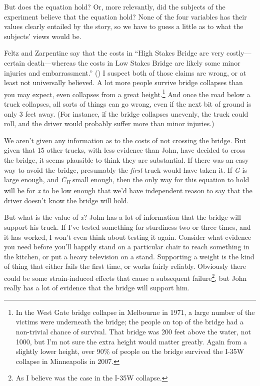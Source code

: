 \documentclass[
  10pt,
  letterpaper,
  DIV=11,
  numbers=noendperiod,
  twoside]{scrartcl}
\begin{document}
But does the equation hold? Or, more relevantly, did the subjects of the
experiment believe that the equation hold? None of the four variables
has their values clearly entailed by the story, so we have to guess a
little as to what the subjects' views would be.

Feltz and Zarpentine say that the costs in ``High Stakes Bridge are very
costly---certain death---whereas the costs in Low Stakes Bridge are
likely some minor injuries and embarrassment.''
() I
suspect both of those claims are wrong, or at least not universally
believed. A lot more people survive bridge collapses than you may
expect, even collapses from a great height.\footnote{In the West Gate
  bridge collapse in Melbourne in 1971, a large number of the victims
  were underneath the bridge; the people on top of the bridge had a
  non-trivial chance of survival. That bridge was 200 feet above the
  water, not 1000, but I'm not sure the extra height would matter
  greatly. Again from a slightly lower height, over 90\% of people on
  the bridge survived the I-35W collapse in Minneapolis in 2007.} And
once the road below a truck collapses, all sorts of things can go wrong,
even if the next bit of ground is only 3 feet away. (For instance, if
the bridge collapses unevenly, the truck could roll, and the driver
would probably suffer more than minor injuries.)

We aren't given any information as to the costs of not crossing the
bridge. But given that 15 other trucks, with less evidence than John,
have decided to cross the bridge, it seems plausible to think they are
substantial. If there was an easy way to avoid the bridge, presumably
the \emph{first} truck would have taken it. If \emph{G} is large enough,
and \emph{C\textsubscript{H}} small enough, then the only way for this
equation to hold will be for \emph{x} to be low enough that we'd have
independent reason to say that the driver doesn't know the bridge will
hold.

But what is the value of \emph{x}? John has a lot of information that
the bridge will support his truck. If I've tested something for
sturdiness two or three times, and it has worked, I won't even think
about testing it again. Consider what evidence you need before you'll
happily stand on a particular chair to reach something in the kitchen,
or put a heavy television on a stand. Supporting a weight is the kind of
thing that either fails the first time, or works fairly reliably.
Obviously there could be some strain-induced effects that cause a
subsequent failure\footnote{As I believe was the case in the I-35W
  collapse.}, but John really has a lot of evidence that the bridge will
support him.
\end{document}
